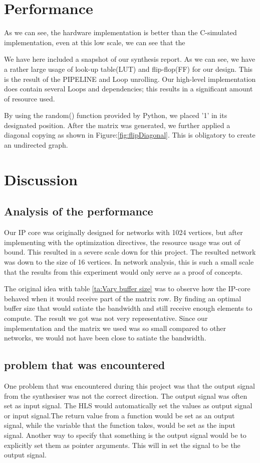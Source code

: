 \section{Performance}
As we can see, the hardware implementation is better than the C-simulated implementation, even at this low scale, we can see that the



We have here included a snapshot of our synthesis report. As we can see, we have a rather large usage of look-up table(LUT) and flip-flop(FF) for our design. This is the result of the PIPELINE and Loop unrolling. Our high-level implementation does contain several Loops and dependencies; this results in a significant amount of resource used. 


By using the random() function provided by Python, we placed '1' in its designated position. After the matrix was generated, we further applied a diagonal copying as shown in Figure:\ref{fig:flipDiagonal}. This is obligatory to create an undirected graph.



\section{Discussion}
\subsection*{Analysis of the performance}
Our IP core was originally designed for networks with 1024 vertices, but after implementing with the optimization directives, the resource usage was out of bound. This resulted in a severe scale down for this project. The resulted network was down to the size of 16 vertices. In network analysis, this is such a small scale that the results from this experiment would only serve as a proof of concepts. 

The original idea with table \ref{ta:Vary buffer size} was to observe how the IP-core behaved when it would receive part of the matrix row. By finding an optimal buffer size that would satiate the bandwidth and still receive enough elements to compute. The result we got was not very representative. Since our implementation and the matrix we used was so small compared to other networks, we would not have been close to satiate the bandwidth.
 
\subsection*{problem that was encountered}
One problem that was encountered during this project was that the output signal from the synthesiser was not the correct direction. The output signal was often set as input signal. The HLS would automatically set the values as output signal or input signal.The return value from a function would be set as an output signal, while the variable that the function takes, would be set as the input signal. Another way to specify that something is the output signal would be to explicitly set them as pointer arguments. This will in set the signal to be the output signal.

